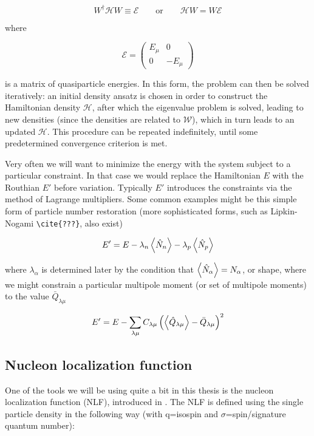 \begin{equation}
W^\dagger \mathcal{H} W \equiv \mathcal{E} \qquad\mathrm{or}\qquad \mathcal{H}W = W\mathcal{E}
\end{equation}

\noindent where

\begin{equation}
\mathcal{E} = \left(\begin{array}{cc}
E_\mu & 0 \\
0 & -E_\mu
\end{array}\right)
\end{equation}

\noindent is a matrix of quasiparticle energies. In this form, the problem can then be solved iteratively: an initial density ansatz is chosen in order to construct the Hamiltonian density $\mathcal{H}$, after which the eigenvalue problem is solved, leading to new densities (since the densities are related to $\mathcal{W}$), which in turn leads to an updated $\mathcal{H}$. This procedure can be repeated indefinitely, until some predetermined convergence criterion is met.

Very often we will want to minimize the energy with the system subject to a particular constraint. In that case we would replace the Hamiltonian $E$ with the Routhian $E'$ before variation. Typically $E'$ introduces the constraints via the method of Lagrange multipliers. Some common examples might be this simple form of particle number restoration (more sophisticated forms, such as Lipkin-Nogami \verb|\cite{???}|, also exist)

\begin{equation}
E' = E - \lambda_n \expval{\hat{N}_n} - \lambda_p \expval{\hat{N}_p}
\end{equation}

\noindent where $\lambda_\alpha$ is determined later by the condition that $\expval{\hat{N}_\alpha} = N_\alpha$, or shape, where we might constrain a particular multipole moment (or set of multipole moments) to the value $\bar{Q}_{\lambda\mu}$

\begin{equation}
E' = E - \sum_{\lambda\mu} C_{\lambda\mu} \left(\expval{\hat{Q}_{\lambda\mu}} - \bar{Q}_{\lambda\mu}\right)^2
\end{equation}


\subsection{Nucleon localization function}
One of the tools we will be using quite a bit in this thesis is the nucleon localization function (NLF), introduced in \cite{Zhang2016}. The NLF is defined using the single particle density in the following way (with q=isospin and $\sigma$=spin/signature quantum number):


